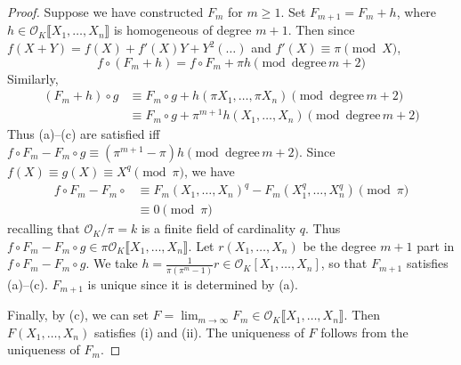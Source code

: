 \documentclass[11pt]{article}
\theoremstyle{definition}
\theoremstyle{plain}
\theoremstyle{remark}
\newcommand{\cO}{\mathcal{O}}
\begin{document}
\begin{proof}
    Suppose we have constructed $F_m$ for $m \ge 1$. Set $F_{m+1} = F_m + h$, where $h \in \cO_K\llbracket X_1, \ldots, X_n \rrbracket$ is homogeneous of degree $m+1$. Then since $f(X+Y) = f(X) + f'(X) Y + Y^2 (\ldots)$ and $f'(X) \equiv \pi \pmod{X}$,
    \begin{equation*}
        f \circ (F_m + h) = f \circ F_m + \pi h \pmod{\mathrm{degree}\,m+2}
    \end{equation*}
    Similarly,
    \begin{align*}
        (F_m + h) \circ g
        &\equiv F_m \circ g + h(\pi X_1, \ldots, \pi X_n) \pmod{\mathrm{degree}\,m+2}\\
        &\equiv F_m \circ g + \pi^{m+1} h(X_1, \ldots, X_n) \pmod{\mathrm{degree}\,m+2}
    \end{align*}
    Thus (a)--(c) are satisfied iff $f \circ F_m - F_m \circ g \equiv (\pi^{m+1} - \pi) h \pmod{\mathrm{degree}\,m+2}$. Since $f(X) \equiv g(X) \equiv X^q \pmod{\pi}$, we have
    \begin{align*}
        f \circ F_m - F_m \circ
        &\equiv F_m(X_1, \ldots, X_n)^q - F_m(X_1^q, \ldots, X_n^q) \pmod{\pi}\\
        &\equiv 0 \pmod{\pi}
    \end{align*}
    recalling that $\cO_K/\pi = k$ is a finite field of cardinality $q$. Thus $f \circ F_m - F_m \circ g \in \pi \cO_K \llbracket X_1, \ldots, X_n \rrbracket$. Let $r(X_1, \ldots, X_n)$ be the degree $m+1$ part in $f \circ F_m - F_m \circ g$. We take $h = \frac{1}{\pi(\pi^m-1)} r \in \cO_K[X_1, \ldots, X_n]$, so that $F_{m+1}$ satisfies (a)--(c). $F_{m+1}$ is unique since it is determined by (a).

    Finally, by (c), we can set $F = \lim_{m \to \infty} F_m \in \cO_K \llbracket X_1, \ldots, X_n \rrbracket$. Then $F(X_1, \ldots, X_n)$ satisfies (i) and (ii). The uniqueness of $F$ follows from the uniqueness of $F_m$.
\end{proof}
\end{document}
